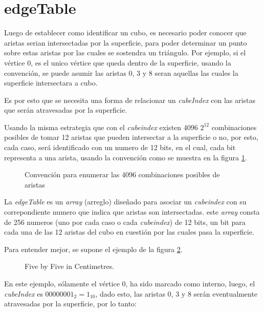 \section{edgeTable}
\label{ch:implementacion:sec:edgeTable}

Luego de establecer como identificar un cubo, es necesario poder conocer que aristas serian intersectadas por la superficie, para poder determinar un punto sobre estas aristas por las cuales se sostendra un triángulo. Por ejemplo, si el vértice $0$, es el unico vértice que queda dentro de la superficie, usando la convención, se puede asumir las aristas $0$, $3$ y $8$ seran aquellas las cuales la superficie intersectara a cubo.

Es por esto que se necesita una forma de relacionar un \emph{cubeIndex} con las aristas que serán atravesadas por la superficie.

Usando la misma estrategia que con el \emph{cubeindex} existen 4096 $2^{12}$ combinaciones posibles de tomar 12 aristas que pueden intersectar a la superficie o no, por esto, cada caso, será identificado con un numero de 12 bits, en el cual, cada bit representa a una arista, usando la convención como se muestra en la figura \ref{f:ch:implementacion:sec:CubeIndex:edgeTable:edge_convention}.

\begin{figure}[hbt]
	\makebox[\textwidth]{\framebox[0.4\textwidth]{\rule{0pt}{0.3\textwidth}}}
	\caption{Convención para enumerar las 4096 combinaciones posibles de aristas}
	\label{f:ch:implementacion:sec:CubeIndex:edgeTable:edge_convention}
\end{figure}

La \emph{edgeTable} es un \emph{array} (arreglo) diseñado para asociar un \emph{cubeindex} con su correpondiente numero que indica que aristas son intersectadas. este \emph{array} consta de 256 numeros (uno por cada caso o cada \emph{cubeindex}) de 12 bits, un bit para cada una de las 12 aristas del cubo en cuestión por las cuales pasa la superficie.

Para entender mejor, se supone el ejemplo de la figura \ref{f:ch:implementacion:sec:CubeIndex:edgeTable:example}.

\begin{figure}[hbt]
	\makebox[\textwidth]{\framebox[0.3\textwidth]{\rule{0pt}{0.2\textwidth}}}
	\caption{Five by Five in Centimetres.}
	\label{f:ch:implementacion:sec:CubeIndex:edgeTable:example}
\end{figure}

En este ejemplo, sólamente el vértice $0$, ha sido marcado como interno, luego, el \emph{cubeIndex} es $0000 0001_{2} = 1_{10}$, dado esto, las aristas $0$, $3$ y $8$ serán eventualmente atravesadas por la superficie, por lo tanto:

